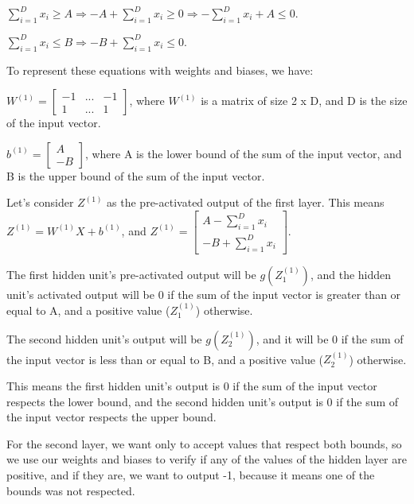 \documentclass{article}
\begin{document}
\bigskip

$ \sum_{i=1}^{D} x_i \geq A \Rightarrow -A + \sum_{i=1}^{D} x_i \geq 0 \Rightarrow -\sum_{i=1}^{D} x_i + A \leq 0$.

\medskip

$ \sum_{i=1}^{D} x_i \leq B \Rightarrow -B + \sum_{i=1}^{D} x_i \leq 0$.

\bigskip

To represent these equations with weights and biases, we have:

\bigskip

\( W^{(1)} = \begin{bmatrix}
    -1 & ...  & -1\\
    1 & ... & 1
\end{bmatrix}
\), where \(W^{(1)}\) is a matrix of size 2 x D, and D is the size of the input vector.

\bigskip

\(b^{(1)} = \begin{bmatrix}
    A\\
    -B
\end{bmatrix}
\), where A is the lower bound of the sum of the input vector, and B is the upper bound of the sum of the input vector.

\bigskip

Let's consider $Z^{(1)}$ as the pre-activated output of the first layer. This means $Z^{(1)} = W^{(1)}X + b^{(1)}$, and
$Z^{(1)} = \begin{bmatrix}
    A -\sum_{i=1}^{D} x_i\\
    -B + \sum_{i=1}^{D} x_i
\end{bmatrix}
$.

\bigskip

The first hidden unit's pre-activated output will be $g(Z_1^{(1)})$, and the hidden unit's activated output 
will be 0 if the sum of the input vector is greater than or equal to A, and a positive value ($Z_1^{(1)}$) otherwise.

The second hidden unit's output will be $g(Z_2^{(1)})$, and it will be 0 if the sum of the input vector is less than or equal to B, 
and a positive value ($Z_2^{(1)}$) otherwise.

This means the first hidden unit's output is 0 if the sum of the input vector respects the lower bound, 
and the second hidden unit's output is 0 if the sum of the input vector respects the upper bound.

\bigskip

For the second layer, we want only to accept values that respect both bounds, so we use our weights and biases to verify if any of the values
of the hidden layer are positive, and if they are, we want to output -1, because it means one of the bounds was not respected.
\end{document}
